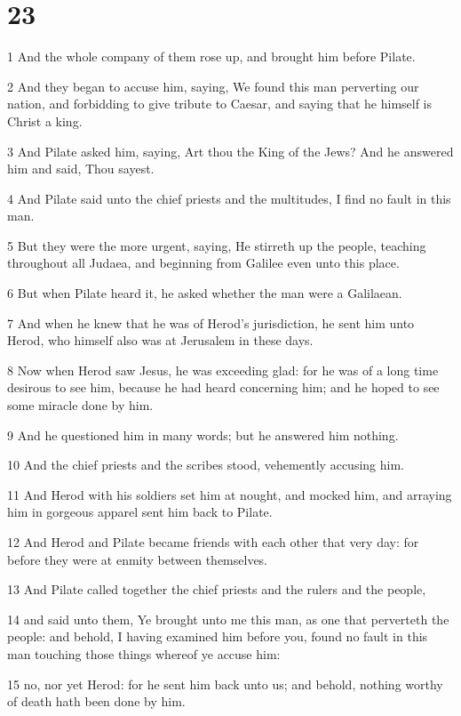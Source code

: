\chapter{23}

\par 1 And the whole company of them rose up, and brought him before Pilate.
\par 2 And they began to accuse him, saying, We found this man perverting our nation, and forbidding to give tribute to Caesar, and saying that he himself is Christ a king.
\par 3 And Pilate asked him, saying, Art thou the King of the Jews? And he answered him and said, Thou sayest.
\par 4 And Pilate said unto the chief priests and the multitudes, I find no fault in this man.
\par 5 But they were the more urgent, saying, He stirreth up the people, teaching throughout all Judaea, and beginning from Galilee even unto this place.
\par 6 But when Pilate heard it, he asked whether the man were a Galilaean.
\par 7 And when he knew that he was of Herod's jurisdiction, he sent him unto Herod, who himself also was at Jerusalem in these days.
\par 8 Now when Herod saw Jesus, he was exceeding glad: for he was of a long time desirous to see him, because he had heard concerning him; and he hoped to see some miracle done by him.
\par 9 And he questioned him in many words; but he answered him nothing.
\par 10 And the chief priests and the scribes stood, vehemently accusing him.
\par 11 And Herod with his soldiers set him at nought, and mocked him, and arraying him in gorgeous apparel sent him back to Pilate.
\par 12 And Herod and Pilate became friends with each other that very day: for before they were at enmity between themselves.
\par 13 And Pilate called together the chief priests and the rulers and the people,
\par 14 and said unto them, Ye brought unto me this man, as one that perverteth the people: and behold, I having examined him before you, found no fault in this man touching those things whereof ye accuse him:
\par 15 no, nor yet Herod: for he sent him back unto us; and behold, nothing worthy of death hath been done by him.
